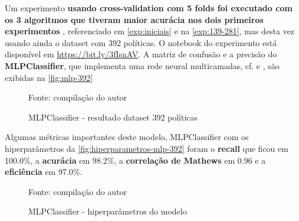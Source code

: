 Um experimento \textbf{usando cross-validation com 5 folds foi executado com os 3 algoritmos que tiveram maior acurácia nos dois primeiros experimentos} , referenciado em \autoref{exp:iniciais} e na \autoref{exp:139-281}, mas desta vez usando ainda o dataset com 392 políticas. O notebook do experimento está disponível em \url{https://bit.ly/3fIsnAV}.
A matriz de confusão e a precisão do \textbf{MLPClassifier}, que implementa uma rede neural multicamadas, cf.  e , são exibidas na \autoref{fig:mlp-392}

\begin{figure}[h!]
	\centering
	\caption{MLPClassifier - resultado dataset 392 políticas}
	
	\label{fig:mlp-392}
	{\scriptsize Fonte: compilação do autor}
\end{figure}

Algumas métricas importantes deste modelo, MLPClassifier com os hiperparâmetros da \autoref{fig:hiperparametros-mlp-392} foram o \textbf{recall} que ficou em 100.0\%, a \textbf{acurácia} em 98.2\%, a \textbf{correlação de Mathews} em 0.96 e a \textbf{eficiência} em 97.0\%. 

\begin{figure}[h!]
	\centering
	\caption{MLPClassifier - hiperparâmetros do modelo}
	
	\label{fig:hiperparametros-mlp-392}
	{\scriptsize Fonte: compilação do autor}
\end{figure}

